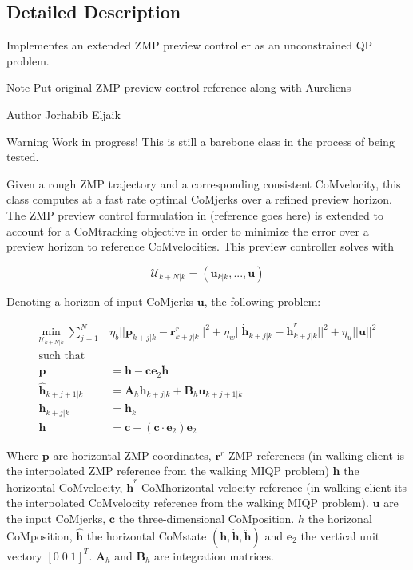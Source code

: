 \subsection{Detailed Description}
Implementes an extended Z\+MP preview controller as an unconstrained QP problem. 

\begin{DoxyNote}{Note}
Put original Z\+MP preview control reference along with Aurelien\textquotesingle{}s
\end{DoxyNote}
\begin{DoxyAuthor}{Author}
Jorhabib Eljaik
\end{DoxyAuthor}
\cite{ibanezThesis2015}

\begin{DoxyWarning}{Warning}
Work in progress! This is still a barebone class in the process of being tested.
\end{DoxyWarning}
Given a rough Z\+MP trajectory and a corresponding consistent Co\+Mvelocity, this class computes at a fast rate optimal Co\+Mjerks over a refined preview horizon. The Z\+MP preview control formulation in (reference goes here) is extended to account for a Co\+Mtracking objective in order to minimize the error over a preview horizon to reference Co\+Mvelocities. This preview controller solves with

\[ \mathcal{U}_{k+N|k} = (\mathbf{u}_{k|k}, ... , \mathbf{u}) \]

Denoting a horizon of input Co\+Mjerks $\mathbf{u}$, the following problem\+:

\begin{align*} \underset{\mathcal{U}_{k+N|k}}{\text{min}} \; \sum_{j=1}^{N} & \eta_b || \mathbf{p}_{k+j|k} - \mathbf{r}_{k+j|k}^r ||^2 + \eta_w ||\mathbf{\dot{h}}_{k+j|k} - \dot{\mathbf{h}}^r_{k+j|k} ||^2 + \eta_u || \mathbf{u} ||^2 \\ \text{such that}&\\ \mathbf{p} &= \mathbf{h} - \mathbf{c}\mathbf{e}_2 \mathbf{\ddot{h}} \\ \mathbf{\hat{h}}_{k+j+1|k} &= \mathbf{A}_h \hat{\mathbf{h}}_{k+j|k} + \mathbf{B}_h \mathbf{u}_{k+j+1|k} \\ \mathbf{h}_{k+j|k} &= \mathbf{h}_k\\ \mathbf{h} &= \mathbf{c} - (\mathbf{c}\cdot\mathbf{e}_2)\mathbf{e}_2 \end{align*}

Where $\mathbf{p}$ are horizontal Z\+MP coordinates, $ \mathbf{r}^r $ Z\+MP references (in walking-\/client is the interpolated Z\+MP reference from the walking M\+I\+QP problem) $ \mathbf{\dot{h}} $ the horizontal Co\+Mvelocity, $ \mathbf{\dot{h}}^r $ Co\+Mhorizontal velocity reference (in walking-\/client it\textquotesingle{}s the interpolated Co\+Mvelocity reference from the walking M\+I\+QP problem). $\mathbf{u}$ are the input Co\+Mjerks, $\mathbf{c}$ the three-\/dimensional Co\+Mposition. $h$ the horizonal Co\+Mposition, $\hat{\mathbf{h}}$ the horizontal Co\+Mstate $ (\mathbf{h}, \mathbf{\dot{h}}, \mathbf{\ddot{h}}) $ and $\mathbf{e}_2$ the vertical unit vectory $ [0\;0\;1]^T$. $\mathbf{A}_h$ and $\mathbf{B}_h$ are integration matrices.

